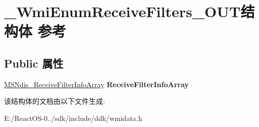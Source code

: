 \hypertarget{struct___wmi_enum_receive_filters___o_u_t}{}\section{\+\_\+\+Wmi\+Enum\+Receive\+Filters\+\_\+\+O\+U\+T结构体 参考}
\label{struct___wmi_enum_receive_filters___o_u_t}
\subsection*{Public 属性}
\begin{DoxyCompactItemize}
\item 
\mbox{\label{struct___wmi_enum_receive_filters___o_u_t_a367f60a2b4fa358d07e831ea9f87270a}} 
\hyperlink{struct___m_s_ndis___receive_filter_info_array}{M\+S\+Ndis\+\_\+\+Receive\+Filter\+Info\+Array} {\bfseries Receive\+Filter\+Info\+Array}
\end{DoxyCompactItemize}


该结构体的文档由以下文件生成\+:\begin{DoxyCompactItemize}
\item 
E\+:/\+React\+O\+S-\/0../sdk/include/ddk/wmidata.\+h\end{DoxyCompactItemize}

